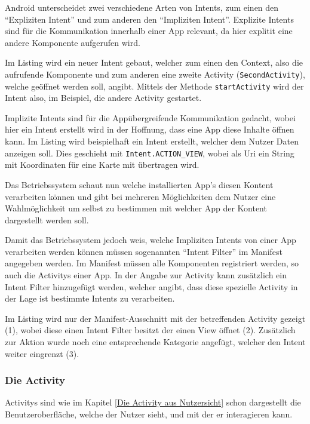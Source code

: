 Android unterscheidet zwei verschiedene Arten von Intents, zum einen den "`Expliziten Intent"' und zum anderen den "`Impliziten Intent"'. Explizite Intents sind f\"ur die Kommunikation innerhalb einer App relevant, da hier explitit eine andere Komponente aufgerufen wird. 

Im Listing wird ein neuer Intent gebaut, welcher zum einen den Context, also die aufrufende Komponente und zum anderen eine zweite Activity (\texttt{SecondActivity}), welche ge\"offnet werden soll, angibt. Mittels der Methode \texttt{startActivity} wird der Intent also, im Beispiel, die andere Activity gestartet.



Implizite Intents sind f\"ur die App\"ubergreifende Kommunikation gedacht, wobei hier ein Intent erstellt wird in der Hoffnung, dass eine App diese Inhalte \"offnen kann.
Im Listing wird beispielhaft ein Intent erstellt, welcher dem Nutzer Daten anzeigen soll. Dies geschieht mit \texttt{Intent.ACTION\_VIEW}, wobei als Uri ein String mit Koordinaten f\"ur eine Karte mit \"ubertragen wird.



Das Betriebssystem schaut nun welche installierten App's diesen Kontent verarbeiten k\"onnen und gibt bei mehreren M\"oglichkeiten dem Nutzer eine Wahlm\"oglichkeit um selbst zu bestimmen mit welcher App der Kontent dargestellt werden soll.

Damit das Betriebssystem jedoch weis, welche Impliziten Intents von einer App verarbeiten werden k\"onnen m\"ussen sogenannten "`Intent Filter"' im Manifest angegeben werden.
Im Manifest m\"ussen alle Komponenten registriert werden, so auch die Activitys einer App. In der Angabe zur Activity kann zus\"atzlich ein Intent Filter hinzugef\"ugt werden, welcher angibt, dass diese spezielle Activity in der Lage ist bestimmte Intents zu verarbeiten.

Im Listing wird nur der Manifest-Ausschnitt mit der betreffenden Activity gezeigt (1), wobei diese einen Intent Filter besitzt der einen View \"offnet (2). Zus\"atzlich zur Aktion wurde noch eine entsprechende Kategorie angef\"ugt, welcher den Intent weiter eingrenzt (3). \cite{VogellaIntent}



\subsubsection{Die Activity} \label{Die Activity aus Programmierersicht}
Activitys sind wie im Kapitel \ref{Die Activity aus Nutzersicht} schon dargestellt die Benutzeroberfl\"ache, welche der Nutzer sieht, und mit der er interagieren kann.

